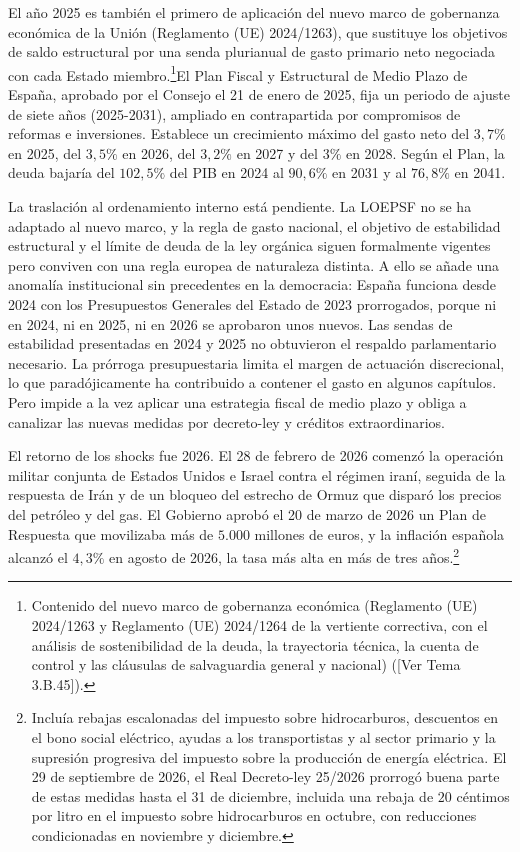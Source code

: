 \documentclass[10pt,a4paper]{article}
\newcommand{\authorfont}[1]{{\fontfamily{EBGaramond-TLF}\selectfont #1}}
\begin{document}
El año 2025 es también el primero de aplicación del nuevo marco de gobernanza económica de la Unión (Reglamento (UE) 2024/1263), que sustituye los objetivos de saldo estructural por una senda plurianual de gasto primario neto negociada con cada Estado miembro.\footnote{Contenido del nuevo marco de gobernanza económica (Reglamento (UE) 2024/1263 y Reglamento (UE) 2024/1264 de la vertiente correctiva, con el análisis de sostenibilidad de la deuda, la trayectoria técnica, la cuenta de control y las cláusulas de salvaguardia general y nacional) ([\authorfont{Ver Tema 3.B.45}]).
}El Plan Fiscal y Estructural de Medio Plazo de España, aprobado por el Consejo el 21 de enero de 2025, fija un periodo de ajuste de siete años (2025-2031), ampliado en contrapartida por compromisos de reformas e inversiones. Establece un crecimiento máximo del gasto neto del $3,7\%$ en 2025, del $3,5\%$ en 2026, del $3,2\%$ en 2027 y del $3\%$ en 2028. Según el Plan, la deuda bajaría del $102,5\%$ del PIB en 2024 al $90,6\%$ en 2031 y al $76,8\%$ en 2041.

La traslación al ordenamiento interno está pendiente. La LOEPSF no se ha adaptado al nuevo marco, y la regla de gasto nacional, el objetivo de estabilidad estructural y el límite de deuda de la ley orgánica siguen formalmente vigentes pero conviven con una regla europea de naturaleza distinta. A ello se añade una anomalía institucional sin precedentes en la democracia: España funciona desde 2024 con los Presupuestos Generales del Estado de 2023 prorrogados, porque ni en 2024, ni en 2025, ni en 2026 se aprobaron unos nuevos. Las sendas de estabilidad presentadas en 2024 y 2025 no obtuvieron el respaldo parlamentario necesario. La prórroga presupuestaria limita el margen de actuación discrecional, lo que paradójicamente ha contribuido a contener el gasto en algunos capítulos. Pero impide a la vez aplicar una estrategia fiscal de medio plazo y obliga a canalizar las nuevas medidas por decreto-ley y créditos extraordinarios.

El retorno de los shocks fue 2026. El 28 de febrero de 2026 comenzó la operación militar conjunta de Estados Unidos e Israel contra el régimen iraní, seguida de la respuesta de Irán y de un bloqueo del estrecho de Ormuz que disparó los precios del petróleo y del gas. El Gobierno aprobó el 20 de marzo de 2026 un Plan de Respuesta que movilizaba más de $5.000$ millones de euros, y la inflación española alcanzó el $4,3\%$ en agosto de 2026, la tasa más alta en más de tres años.\footnote{Incluía rebajas escalonadas del impuesto sobre hidrocarburos, descuentos en el bono social eléctrico, ayudas a los transportistas y al sector primario y la supresión progresiva del impuesto sobre la producción de energía eléctrica. El 29 de septiembre de 2026, el Real Decreto-ley 25/2026 prorrogó buena parte de estas medidas hasta el 31 de diciembre, incluida una rebaja de $20$ céntimos por litro en el impuesto sobre hidrocarburos en octubre, con reducciones condicionadas en noviembre y diciembre.
} 
\end{document}
